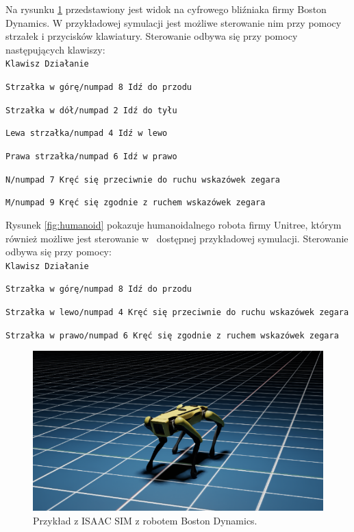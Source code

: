 \documentclass[12pt]{article}
\begin{document}
\newpage

\noindent Na rysunku \ref{fig:bostonDyna} przedstawiony jest widok na cyfrowego bliźniaka firmy Boston Dynamics. W przykładowej symulacji jest możliwe sterowanie nim przy pomocy strzałek i przycisków klawiatury. Sterowanie odbywa się przy pomocy następujących klawiszy: \\ 

\texttt{Klawisz  Działanie}

\texttt{Strzałka w górę/numpad 8  Idź do przodu}

\texttt{Strzałka w dół/numpad 2  Idź do tyłu}

\texttt{Lewa strzałka/numpad 4  Idź w lewo}

\texttt{Prawa strzałka/numpad 6  Idź w prawo}

\texttt{N/numpad 7  Kręć się przeciwnie do ruchu wskazówek zegara}

\texttt{M/numpad 9 Kręć się zgodnie z ruchem wskazówek zegara}

\noindent Rysunek \ref{fig:humanoid} pokazuje humanoidalnego robota firmy Unitree, którym również możliwe jest sterowanie w~ dostępnej przykładowej symulacji. Sterowanie odbywa się przy pomocy: \\

\texttt{Klawisz  Działanie}

\texttt{Strzałka w górę/numpad 8  Idź do przodu}

\texttt{Strzałka w lewo/numpad 4 Kręć się przeciwnie do ruchu wskazówek zegara}

\texttt{Strzałka w prawo/numpad 6 Kręć się zgodnie z ruchem wskazówek zegara}

\begin{figure}[h]
    \centering
    \includegraphics[width=0.8\linewidth]{Zdjęcia/przykladBoston.png}
    \caption{Przykład z ISAAC SIM z robotem Boston Dynamics.}
    \label{fig:bostonDyna}
\end{figure}
\end{document}
